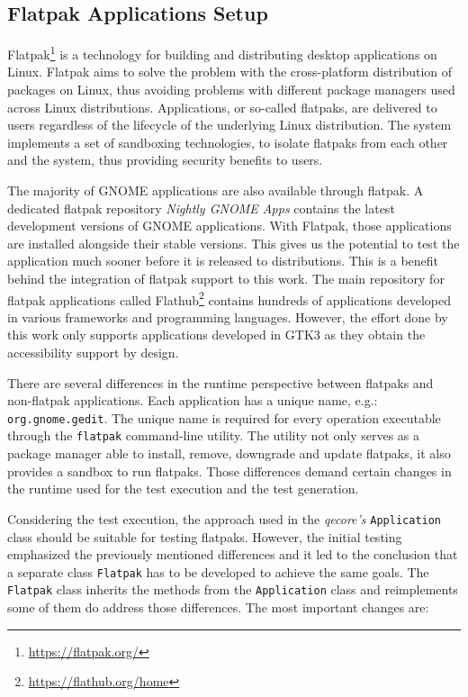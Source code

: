 \subsection{Flatpak Applications Setup}
Flatpak\footnote{\url{https://flatpak.org/}} is a technology for building and distributing desktop applications on Linux. Flatpak aims to solve the problem with the cross-platform distribution of packages on Linux, thus avoiding problems with different package managers used across Linux distributions. Applications, or so-called flatpaks, are delivered to users regardless of the lifecycle of the underlying Linux distribution. The system implements a set of sandboxing technologies, to isolate flatpaks from each other and the system, thus providing security benefits to users.\cite{flatpak}

The majority of GNOME applications are also available through flatpak. A dedicated flatpak repository \textit{Nightly GNOME Apps} contains the latest development versions of GNOME applications. With Flatpak, those applications are installed alongside their stable versions. This gives us the potential to test the application much sooner before it is released to distributions. This is a benefit behind the integration of flatpak support to this work. The main repository for flatpak applications called Flathub\footnote{\url{https://flathub.org/home}} contains hundreds of applications developed in various frameworks and programming languages. However, the effort done by this work only supports applications developed in GTK3 as they obtain the accessibility support by design.

There are several differences in the runtime perspective between flatpaks and non-flatpak applications. Each application has a unique name, e.g.: \texttt{org.gnome.gedit}. The unique name is required for every operation executable through the \texttt{flatpak} command-line utility. The utility not only serves as a package manager able to install, remove, downgrade and update flatpaks, it also provides a sandbox to run flatpaks. Those differences demand certain changes in the runtime used for the test execution and the test generation. 

Considering the test execution, the approach used in the \textit{qecore's} \texttt{Application} class should be suitable for testing flatpaks. However, the initial testing emphasized the previously mentioned differences and it led to the conclusion that a separate class \texttt{Flatpak} has to be developed to achieve the same goals. The \texttt{Flatpak} class inherits the methods from the \texttt{Application} class and reimplements some of them do address those differences. The most important changes are:

